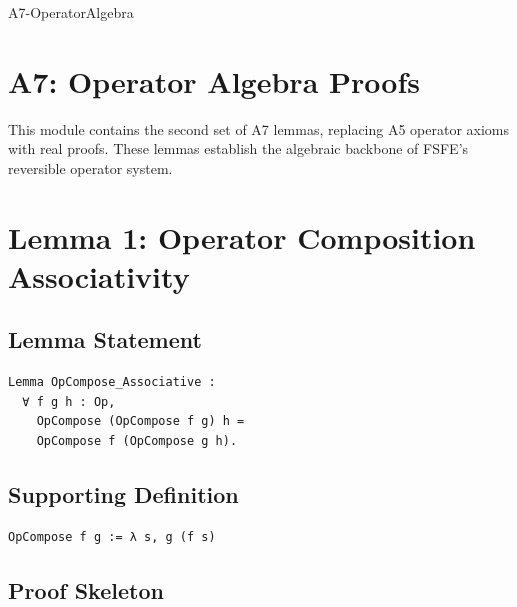 \documentclass[11pt]{article}
\begin{document}


\begin{citationmembrane}{A7-OperatorAlgebra}
\end{citationmembrane}

\section*{A7: Operator Algebra Proofs}

This module contains the second set of A7 lemmas, replacing A5 operator axioms
with real proofs. These lemmas establish the algebraic backbone of FSFE’s
reversible operator system.

\newpage


\section{Lemma 1: Operator Composition Associativity}

\subsection{Lemma Statement}

\begin{verbatim}
Lemma OpCompose_Associative :
  ∀ f g h : Op,
    OpCompose (OpCompose f g) h =
    OpCompose f (OpCompose g h).
\end{verbatim}

\subsection{Supporting Definition}

\begin{verbatim}
OpCompose f g := λ s, g (f s)
\end{verbatim}

\subsection{Proof Skeleton}
\end{document}
